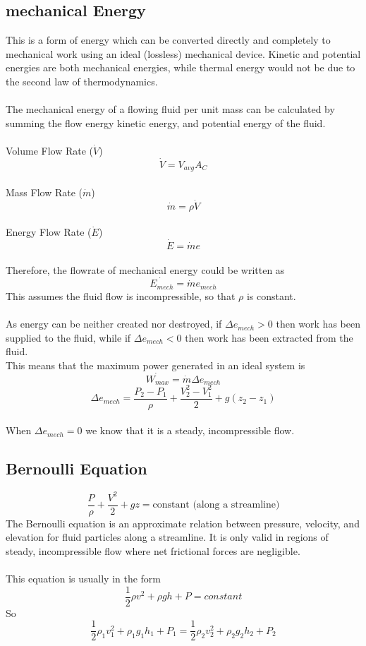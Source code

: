 \documentclass[12pt,a4paper]{article}
\begin{document}
    \subsection{mechanical Energy}
        This is a form of energy which can be converted directly and completely to mechanical work using an ideal (lossless) mechanical device. Kinetic and potential energies are both mechanical energies, while thermal energy would not be due to the second law of thermodynamics. \\
        \\
        The mechanical energy of a flowing fluid per unit mass can be calculated by summing the flow energy kinetic energy, and potential energy of the fluid. \\
        \\
        Volume Flow Rate ($\dot{V}$)
        \[\dot{V}=V_{avg}A_C\]
        \\
        Mass Flow Rate ($\dot{m}$)
        \[\dot{m}=\rho \dot{V}\]
        \\
        Energy Flow Rate ($\dot{E}$)
        \[\dot{E}=\dot{m}e\]
        \\
        Therefore, the flowrate of mechanical energy could be written as 
        \[\dot{E_{mech}}=\dot{m}e_{mech}\]
        This  assumes the fluid flow is incompressible, so that $\rho$ is constant. \\
        \\
        As energy can be neither created nor destroyed, if $\Delta e_{mech}>0$ then work has been supplied to the fluid, while if $\Delta e_{mech}<0$ then work has been extracted from the fluid.\\
        This means that the maximum power generated in an ideal system is 
        \[\dot{W_{max}}=\dot{m} \Delta e_{mech}\]
        \[\Delta e_{mech}=\frac{P_2-P_1}{\rho}+\frac{V^2_2-V^2_1}{2}+g(z_2-z_1)\]
        \\
        When $\Delta e_{mech} =0$ we know that it is a steady, incompressible flow. 

    \subsection{Bernoulli Equation}
        \[\frac{P}{\rho}+\frac{V^2}{2}+gz=\text{constant (along a streamline)}\]
        The Bernoulli equation is an approximate relation between pressure, velocity, and elevation for fluid particles along a streamline. It is only valid in regions of steady, incompressible flow where net frictional forces are negligible. \\
        \\
        This equation is usually in the form
        \[\frac{1}{2}\rho v^2 + \rho gh + P = constant\]
        So
        \[\frac{1}{2}\rho_1 v_1^2 + \rho_1 g_1h_1 + P_1 = \frac{1}{2}\rho_2 v_2^2 + \rho_2 g_2h_2 + P_2\]
        
\end{document}
